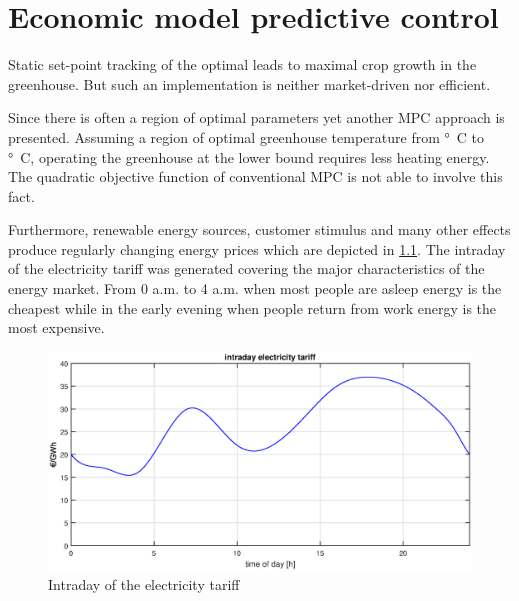 \chapter{Economic model predictive control}
\label{cha:economic}

Static set-point tracking of the optimal leads to maximal crop growth in the greenhouse.
But such an implementation is neither market-driven nor efficient.

Since there is often a region of optimal parameters yet another MPC approach is presented. 
Assuming a region of optimal greenhouse temperature from \unit[24]{°C} to \unit[26]{°C}, operating the greenhouse at the lower bound requires less heating energy.
The quadratic objective function of conventional MPC is not able to involve this fact.

Furthermore, renewable energy sources, customer stimulus and many other effects produce regularly changing energy prices which are depicted in \cref{fig:electricity_tariff}.
The intraday of the electricity tariff was generated covering the major characteristics of the energy market.
From 0 a.m. to 4 a.m. when most people are asleep energy is the cheapest while in the early evening when people return from work energy is the most expensive.

\begin{figure}[t]
\begin{center}
	\includegraphics[width=\textwidth]{../Figures/intraday_electricity_tariff.eps}
	\caption{Intraday of the electricity tariff}
	\label{fig:electricity_tariff}
\end{center}
\end{figure}

